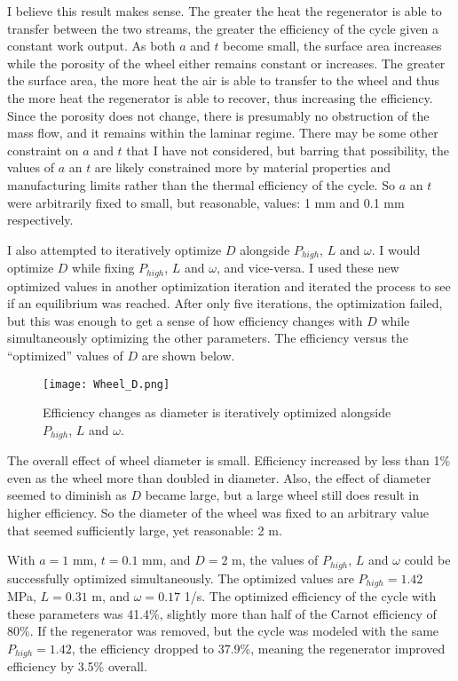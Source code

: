 \documentclass[12pt]{report}
\begin{document}
I believe this result makes sense.  The greater the heat the regenerator is able to transfer between the two streams, the greater the efficiency of the cycle given a constant work output.  As both $a$ and $t$ become small, the surface area increases while the porosity of the wheel either remains constant or increases.  The greater the surface area, the more heat the air is able to transfer to the wheel and thus the more heat the regenerator is able to recover, thus increasing the efficiency.  Since the porosity does not change, there is presumably no obstruction of the mass flow, and it remains within the laminar regime.  There may be some other constraint on $a$ and $t$ that I have not considered, but barring that possibility, the values of $a$ an $t$ are likely constrained more by material properties and manufacturing limits rather than the thermal efficiency of the cycle.  So $a$ an $t$ were arbitrarily fixed to small, but reasonable, values: 1 mm and 0.1 mm respectively. 

I also attempted to iteratively optimize $D$ alongside $P_{high}$, $L$ and $\omega$.  I would optimize $D$ while fixing $P_{high}$, $L$ and $\omega$, and vice-versa.  I used these new optimized values in another optimization iteration and iterated the process to see if an equilibrium was reached.  After only five iterations, the optimization failed, but this was enough to get a sense of how efficiency changes with $D$ while simultaneously optimizing the other parameters.  The efficiency versus the ``optimized'' values of $D$ are shown below. 
\begin{figure}[ht]
	\centering
	\texttt{[image: Wheel\_D.png]}
	\captionsetup{width=\linewidth}
	\caption{Efficiency changes as diameter is iteratively optimized alongside $P_{high}$, $L$ and $\omega$.}
	\label{fig:wheel}
\end{figure} 
The overall effect of wheel diameter is small.  Efficiency increased by less than 1\% even as the wheel more than doubled in diameter.  Also, the effect of diameter seemed to diminish as $D$ became large, but a large wheel still does result in higher efficiency.  So the diameter of the wheel was fixed to an arbitrary value that seemed sufficiently large, yet reasonable: 2 m.  

With $a = 1$ mm, $t=0.1$ mm, and $D=2$ m, the values of $P_{high}$, $L$ and $\omega$ could be successfully optimized simultaneously.  The optimized values are $P_{high}=1.42$ MPa, $L=0.31$ m, and $\omega =0.17$ 1/s.  The optimized efficiency of the cycle with these parameters was 41.4\%, slightly more than half of the Carnot efficiency of 80\%.  If the regenerator was removed, but the cycle was modeled with the same $P_{high}=1.42$, the efficiency dropped to 37.9\%, meaning the regenerator improved efficiency by 3.5\% overall.  
\nocite{*}

 
\end{document}

